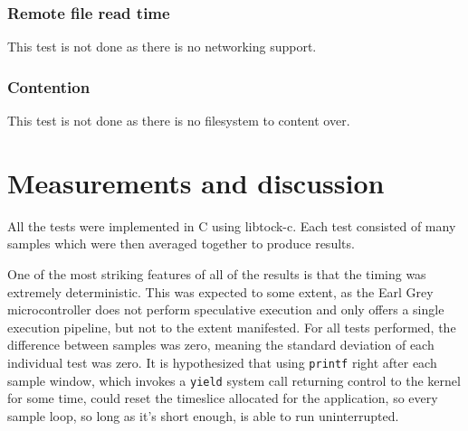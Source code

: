 \documentclass{article}
\begin{document}
\subsubsection{Remote file read time}
This test is not done as there is no networking support.

\subsubsection{Contention}
This test is not done as there is no filesystem to content over.

\section{Measurements and discussion}

All the tests were implemented in C using libtock-c. Each test consisted of many samples which were then averaged together to produce results.

One of the most striking features of all of the results is that the timing was extremely deterministic. This was expected to some extent, as the Earl Grey microcontroller does not perform speculative execution and only offers a single execution pipeline, but not to the extent manifested. For all tests performed, the difference between samples was zero, meaning the standard deviation of each individual test was zero. It is hypothesized that using \texttt{printf} right after each sample window, which invokes a \texttt{yield} system call returning control to the kernel for some time, could reset the timeslice allocated for the application, so every sample loop, so long as it's short enough, is able to run uninterrupted.
\end{document}
